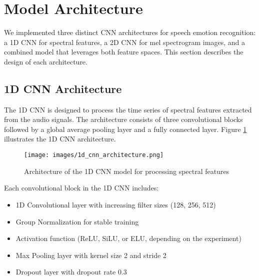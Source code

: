 \section{Model Architecture}

We implemented three distinct CNN architectures for speech emotion recognition: a 1D CNN for spectral features, a 2D CNN for mel spectrogram images, and a combined model that leverages both feature spaces. This section describes the design of each architecture.

\subsection{1D CNN Architecture}

The 1D CNN is designed to process the time series of spectral features extracted from the audio signals. The architecture consists of three convolutional blocks followed by a global average pooling layer and a fully connected layer. Figure \ref{fig:1d_cnn} illustrates the 1D CNN architecture.

\begin{figure}[h]
    \centering
    \texttt{[image: images/1d\_cnn\_architecture.png]}
    \caption{Architecture of the 1D CNN model for processing spectral features}
    \label{fig:1d_cnn}
\end{figure}

Each convolutional block in the 1D CNN includes:
\begin{itemize}
    \item 1D Convolutional layer with increasing filter sizes (128, 256, 512)
    \item Group Normalization for stable training
    \item Activation function (ReLU, SiLU, or ELU, depending on the experiment)
    \item Max Pooling layer with kernel size 2 and stride 2
    \item Dropout layer with dropout rate 0.3
\end{itemize}

